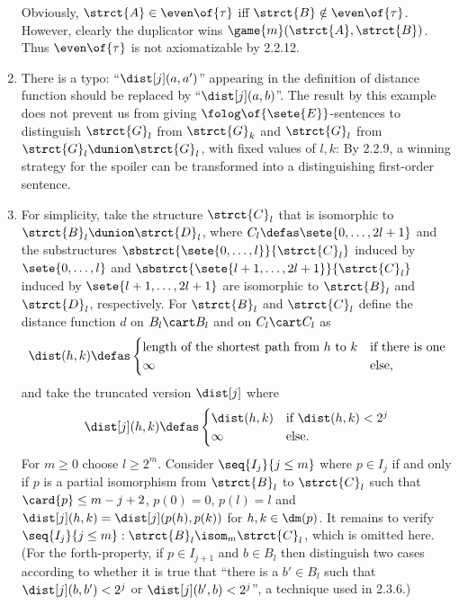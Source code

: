 \begin{enumerate}[1.]
Obviously, $\strct{A} \in \even\of{\tau}$ iff $\strct{B} \notin \even\of{\tau}$. However, clearly the duplicator wins $\game{m}(\strct{A}, \strct{B})$. Thus $\even\of{\tau}$ is not axiomatizable by 2.2.12.
%
\item {} There is a typo: ``$\dist[j](a, a')$'' appearing in the definition of distance function should be replaced by ``$\dist[j](a, b)$''.
\newpar
The result by this example does not prevent us from giving $\folog\of{\sete{E}}$-sentences to distinguish $\strct{G}_l$ from $\strct{G}_k$ and $\strct{G}_l$ from $\strct{G}_l \dunion \strct{G}_l$, with fixed values of $l, k$: By 2.2.9, a winning strategy for the spoiler can be transformed into a distinguishing first-order sentence.
%
\item {} For simplicity, take the structure $\strct{C}_l$ that is isomorphic to $\strct{B}_l \dunion \strct{D}_l$, where $C_l \defas \sete{0, \ldots, 2l + 1}$ and the substructures $\sbstrct{\sete{0, \ldots, l}}{\strct{C}_l}$ induced by $\sete{0, \ldots, l}$ and $\sbstrct{\sete{l + 1, \ldots, 2l + 1}}{\strct{C}_l}$ induced by $\sete{l + 1, \ldots, 2l + 1}$ are isomorphic to $\strct{B}_l$ and $\strct{D}_l$, respectively.
\newpar
For $\strct{B}_l$ and $\strct{C}_l$ define the distance function $d$ on $B_l \cart B_l$ and on $C_l \cart C_l$ as
\[
\dist(h, k) \defas
\begin{cases}
\mbox{length of the shortest path from \begin{math}h\end{math} to \begin{math}k\end{math}} & \mbox{if there is one} \cr
\infty & \mbox{else},
\end{cases}
\]
and take the truncated version $\dist[j]$ where
\[
\dist[j](h, k) \defas
\begin{cases}
\dist(h, k) & \mbox{if \begin{math}\dist(h, k) < 2^j\end{math}} \cr
\infty & \mbox{else}.
\end{cases}
\]
For $m \geq 0$ choose $l \geq 2^m$. Consider $\seq{I_j}{j \leq m}$ where $p \in I_j$ if and only if $p$ is a partial isomorphism from $\strct{B}_l$ to $\strct{C}_l$ such that $\card{p} \leq m - j + 2$, $p(0) = 0$, $p(l) = l$ and $\dist[j](h, k) = \dist[j](p(h), p(k))$ for $h, k \in \dm(p)$.
\newpar
It remains to verify $\seq{I_j}{j \leq m} : \strct{B}_l \isom_m \strct{C}_l$, which is omitted here. (For the forth-property, if $p \in I_{j + 1}$ and $b \in B_l$ then distinguish two cases according to whether it is true that ``there is a $b' \in B_l$ such that $\dist[j](b, b') < 2^j$ or $\dist[j](b', b) < 2^j$'', a technique used in 2.3.6.)

\end{enumerate}
